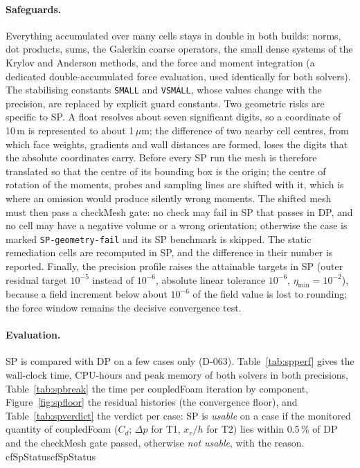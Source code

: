 \documentclass[11pt,a4paper]{article}
\newcommand{\cfpendingmark}{\fbox{\scriptsize pending}}
\newcommand{\cfnum}[1]{%
  \ifcsname cf#1\endcsname\csname cf#1\endcsname\else\cfpendingmark\fi}
\newcommand{\code}[1]{\texttt{#1}}
\begin{document}
\paragraph{Safeguards.} Everything accumulated over many cells stays in
double in both builds: norms, dot products, sums, the Galerkin coarse
operators, the small dense systems of the Krylov and Anderson methods, and
the force and moment integration (a dedicated double-accumulated force
evaluation, used identically for both solvers). The stabilising constants
\code{SMALL} and \code{VSMALL}, whose values change with the precision, are
replaced by explicit guard constants. Two geometric risks are specific to SP.
A float resolves about seven significant digits, so a coordinate of 10\,m
is represented to about 1\,$\mu$m; the difference of two nearby cell
centres, from which face weights, gradients and wall distances are formed,
loses the digits that the absolute coordinates carry. Before every SP run
the mesh is therefore translated so that the centre of its bounding box is
the origin; the centre of rotation of the moments, probes and sampling
lines are shifted with it, which is where an omission would produce silently
wrong moments. The shifted mesh must then pass a checkMesh gate: no check
may fail in SP that passes in DP, and no cell may have a negative volume or
a wrong orientation; otherwise the case is marked \code{SP-geometry-fail}
and its SP benchmark is skipped. The static remediation cells are
recomputed in SP, and the difference in their number is reported. Finally,
the precision profile raises the attainable targets in SP (outer residual
target $10^{-5}$ instead of $10^{-6}$, absolute linear tolerance $10^{-6}$,
$\eta_{\min}=10^{-2}$), because a field increment below about $10^{-6}$ of
the field value is lost to rounding; the force window remains the decisive
convergence test.

\paragraph{Evaluation.} SP is compared with DP on a few cases only
(D-063). Table~\ref{tab:spperf} gives the wall-clock time, CPU-hours and
peak memory of both solvers in both precisions,
Table~\ref{tab:spbreak} the time per coupledFoam iteration by component,
Figure~\ref{fig:spfloor} the residual histories (the convergence floor),
and Table~\ref{tab:spverdict} the verdict per case: SP is \emph{usable} on a
case if the monitored quantity of coupledFoam ($C_d$; $\Delta p$ for T1,
$x_r/h$ for T2) lies within 0.5\,\% of DP and the checkMesh gate passed,
otherwise \emph{not usable}, with the reason. \cfnum{SpStatus}
\end{document}
